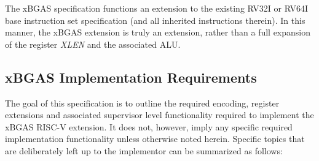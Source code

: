\documentclass{article}
\begin{document}
The xBGAS specification functions an extension to the existing RV32I or RV64I~\cite{RVSpec} 
base instruction set specification (and all inherited instructions therein).  In this 
manner, the xBGAS extension is truly an extension, rather than a full expansion 
of the register \textit{XLEN} and the associated ALU.

\subsection{xBGAS Implementation Requirements}

The goal of this specification is to outline the required encoding, register extensions 
and associated supervisor level functionality required to implement the xBGAS 
RISC-V extension.  It does not, however, imply any specific required implementation 
functionality unless otherwise noted herein.  Specific topics that are deliberately 
left up to the implementor can be summarized as follows:
\end{document}
